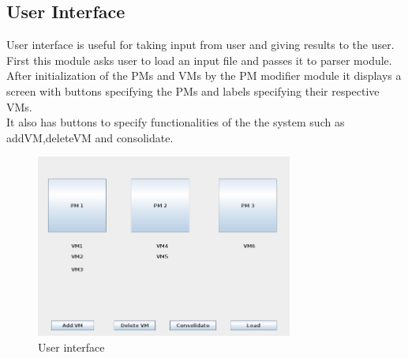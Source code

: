 ﻿\documentclass[a4paper,11pt]{article}
\begin{document}
\subsection{User Interface}
User interface is useful for taking input from  user and giving results to the user. First this module asks user to load an 
input file and passes it to parser module. After initialization of the PMs and VMs by the PM modifier module it displays a 
screen with buttons specifying the PMs and labels specifying their respective VMs.\\
It also has buttons to specify functionalities of the the system such as addVM,deleteVM and consolidate. 
\begin{figure}[h]
\centering
\includegraphics[height=6cm]{3.png}
\caption{User interface}
\end{figure}
\end{document}
